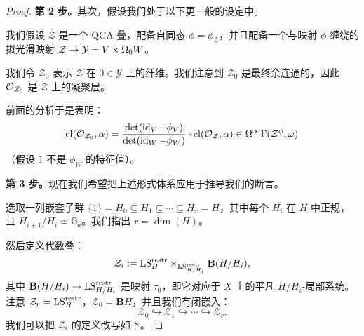 \begin{proof}
\textbf{第 2 步。}其次，假设我们处于以下更一般的设定中。

我们假设 $\mathcal{Z}$ 是一个 QCA 叠，配备自同态 $\phi=\phi_{\mathcal{Z}}$，并且配备一个与映射 $\phi$ 缠绕的拟光滑映射 $\mathcal{Z}\to\mathcal{Y}=V\times\Omega_0W$。

我们令 $\mathcal{Z}_0$ 表示 $\mathcal{Z}$ 在 $0\in\mathcal{Y}$ 上的纤维。我们注意到 $\mathcal{Z}_0$ 是最终余连通的，因此 $\mathcal{O}_{\mathcal{Z}_0}$ 是 $\mathcal{Z}$ 上的凝聚层。

前面的分析于是表明：
\begin{equation}
  \operatorname{cl}(\mathcal{O}_{\mathcal{Z}_0},\alpha)
  =\frac{\det(\operatorname{id}_V-\phi_V)}{\det(\operatorname{id}_W-\phi_W)}\cdot\operatorname{cl}(\mathcal{O}_{\mathcal{Z}},\alpha)
  \in\Omega^\infty\Gamma(\mathcal{Z}^{\phi},\omega)
\end{equation}
（假设 $1$ 不是 $\phi_W$ 的特征值）。

\textbf{第 3 步。}现在我们希望把上述形式体系应用于推导我们的断言。

选取一列嵌套子群 $\{1\}=H_0\subseteq H_1\subseteq\cdots\subseteq H_r=H$，其中每个 $H_i$ 在 $H$ 中正规，且 $H_{i+1}/H_i\simeq\mathbb{G}_a$。我们指出 $r=\dim(H)$。

然后定义代数叠：
\[
  \mathcal{Z}_i:=\mathrm{LS}^{\mathrm{restr}}_{H}\times_{\mathrm{LS}^{\mathrm{restr}}_{H/H_i}}\mathbf{B}(H/H_i),
\]
其中 $\mathbf{B}(H/H_i)\to\mathrm{LS}^{\mathrm{restr}}_{H/H_i}$ 是映射 $\tau_0$，即它对应于 $X$ 上的平凡 $H/H_i$-局部系统。注意 $\mathcal{Z}_r=\mathrm{LS}^{\mathrm{restr}}_{H}$，$\mathcal{Z}_0=\mathbf{B}H$，并且我们有闭嵌入：
\[
  \mathcal{Z}_0\hookrightarrow\mathcal{Z}_1\hookrightarrow\cdots\hookrightarrow\mathcal{Z}_r.
\]
我们可以把 $\mathcal{Z}_i$ 的定义改写如下。


\end{proof}
